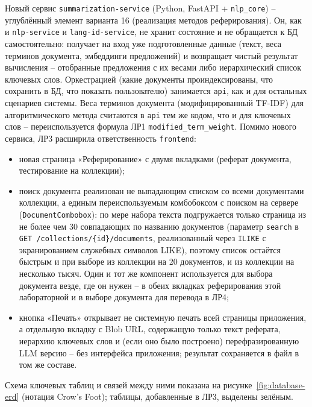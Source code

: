 Новый сервис \texttt{summarization-service} (Python, FastAPI +
\texttt{nlp\_core}) -- углублённый элемент варианта 16 (реализация
методов реферирования). Он, как и \texttt{nlp-service} и
\texttt{lang-id-service}, не хранит состояние и не обращается к БД
самостоятельно: получает на вход уже подготовленные данные (текст,
веса терминов документа, эмбеддинги предложений) и возвращает чистый
результат вычисления -- отобранные предложения с их весами либо
иерархический список ключевых слов. Оркестрацией (какие документы
проиндексированы, что сохранить в БД, что показать пользователю)
занимается \texttt{api}, как и для остальных сценариев системы. Веса
терминов документа (модифицированный TF-IDF) для алгоритмического
метода считаются в \texttt{api} тем же кодом, что и для ключевых слов
-- переиспользуется формула ЛР1 \texttt{modified\_term\_weight}. Помимо
нового сервиса, ЛР3 расширила ответственность \texttt{frontend}:
\begin{itemize}
  \item новая страница «Реферирование» с двумя вкладками (реферат
  документа, тестирование на коллекции);
  \item поиск документа реализован не выпадающим списком со всеми
  документами коллекции, а единым переиспользуемым комбобоксом с
  поиском на сервере (\texttt{DocumentCombobox}): по мере набора
  текста подгружается только страница из не более чем 30 совпадающих
  по названию документов (параметр \texttt{search} в
  \texttt{GET /collections/\{id\}/documents}, реализованный через
  \texttt{ILIKE} с экранированием служебных символов LIKE), поэтому
  список остаётся быстрым и при выборе из коллекции на 20 документов, и
  из коллекции на несколько тысяч. Один и тот же компонент используется
  для выбора документа везде, где он нужен -- в обеих вкладках
  реферирования этой лабораторной и в выборе документа для перевода в
  ЛР4;
  \item кнопка «Печать» открывает не системную печать всей страницы
  приложения, а отдельную вкладку с Blob URL, содержащую только текст
  реферата, иерархию ключевых слов и (если оно было построено)
  перефразированную LLM версию -- без интерфейса приложения;
  результат сохраняется в файл в том же составе.
\end{itemize}


Схема ключевых таблиц и связей между ними показана на
рисунке~\ref{fig:database-erd} (нотация Crow's Foot); таблицы,
добавленные в ЛР3, выделены зелёным.


